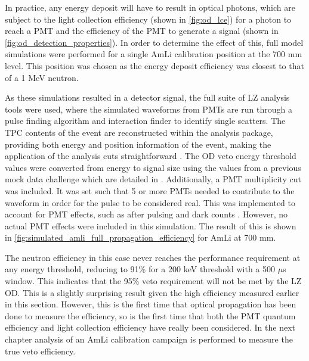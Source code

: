 



\par
In practice, any energy deposit will have to result in optical photons, which are subject to the light collection efficiency (shown in \autoref{fig:od_lce}) for a photon to reach a PMT and the efficiency of the PMT to generate a signal (shown in \autoref{fig:od_detection_properties}).
In order to determine the effect of this, full model simulations were performed for a single AmLi calibration position at the 700 mm level.
This position was chosen as the energy deposit efficiency was closest to that of a 1 MeV neutron.

\par
As these simulations resulted in a detector signal, the full suite of LZ analysis tools were used, where the simulated waveforms from PMTs are run through a pulse finding algorithm and interaction finder to identify single scatters.
The TPC contents of the event are reconstructed within the analysis package, providing both energy and position information of the event, making the application of the analysis cuts straightforward \cite{lz_simulations_ref}.
The OD veto energy threshold values were converted from energy to signal size using the values from a previous mock data challenge which are detailed in \cite{jonathannikoleyczik_thesis_ref}.
Additionally, a PMT multiplicity cut was included.
It was set such that 5 or more PMTs needed to contribute to the waveform in order for the pulse to be considered real.
This was implemented to account for PMT effects, such as after pulsing and dark counts \cite{jonathannikoleyczik_thesis_ref}.
However, no actual PMT effects were included in this simulation.
The result of this is shown in \autoref{fig:simulated_amli_full_propagation_efficiency} for AmLi at 700 mm. 

\par
The neutron efficiency in this case never reaches the performance requirement at any energy threshold, reducing to 91\% for a 200 keV threshold with a 500 $\mu$s window.
This indicates that the 95\% veto requirement will not be met by the LZ OD.
This is a slightly surprising result given the high efficiency measured earlier in this section.
However, this is the first time that optical propagation has been done to measure the efficiency, so is the first time that both the PMT quantum efficiency and light collection efficiency have really been considered.
In the next chapter analysis of an AmLi calibration campaign is performed to measure the true veto efficiency.

